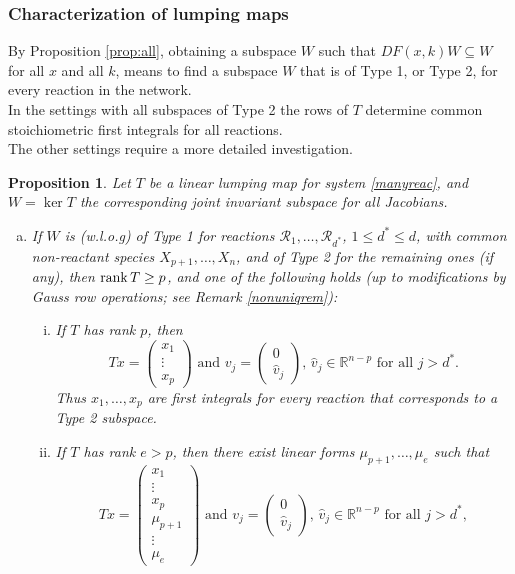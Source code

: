 \documentclass{article}
\newtheorem{proposition}{Proposition}
\begin{document}
\subsubsection{Characterization of lumping maps}
By Proposition \ref{prop:all}, obtaining a subspace $W$ such that $DF(x,k)W\subseteq W$ for all $x$ and all $k$, means to find a subspace $W$ that is of Type 1, or Type 2, for every reaction in the network. \\
In the settings with all subspaces of Type 2 the rows of $T$ determine common stoichiometric first integrals for all reactions. \\
The other settings require a more detailed investigation.
\begin{proposition}\label{prop:mixlump}
Let $T$ be a linear lumping map for system \eqref{manyreac}, and $W=\ker T$ the corresponding joint invariant subspace for all Jacobians. 
\begin{enumerate}[(a)]
    \item 
 If $W$ is (w.l.o.g) of Type 1 for reactions $\mathcal R_1,\ldots,\mathcal R_{d^*}$, $1\leq d^*\leq d$, with common non-reactant species $X_{p+1},\ldots,X_n$, and of Type 2 for the remaining ones (if any), then ${\rm rank}\,T\geq p$, and one of the following holds (up to modifications by Gauss row operations; see Remark \ref{nonuniqrem}):
\begin{enumerate}[(i)]
\item If $T$ has rank $p$, then
\[
Tx=\begin{pmatrix}x_1\\ \vdots\\ x_p\end{pmatrix}\text{  and  } v_j=\begin{pmatrix} 0\\ \widehat v_j\end{pmatrix},\, \widehat v_j\in \mathbb R^{n-p} \text{  for all  } j>d^*.
\]
Thus $x_1,\ldots,x_p$ are first integrals for every reaction that corresponds to a Type 2 subspace.
\item If $T$ has rank $e>p$, then
there exist linear forms $\mu_{p+1},\ldots,\mu_e$ such that
\[
Tx=\begin{pmatrix}x_1\\ \vdots\\ x_p\\ \mu_{p+1}\\ \vdots\\ \mu_e\end{pmatrix}\text{  and  } v_j=\begin{pmatrix} 0\\ \widehat v_j\end{pmatrix},\, \widehat v_j\in \mathbb R^{n-p} \text{  for all  } j>d^*,
\]
\end{enumerate}
\end{enumerate}
\end{proposition}
\end{document}
